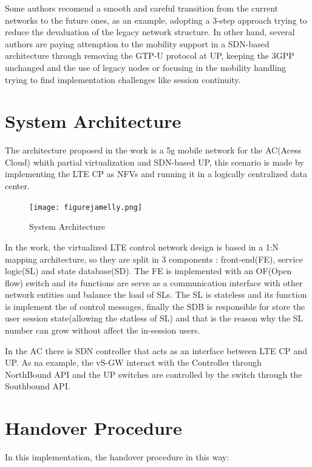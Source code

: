 \documentclass[12pt]{article}
\begin{document}
Some authors recomend a smooth and careful transition from the current networks to the future ones, as an example, adopting a 3-step approach trying to reduce the devaluation of the legacy network structure. In other hand, several authors are paying attemption to the mobility support in a SDN-based architecture through removing the  GTP-U protocol at UP, keeping the 3GPP unchanged and the use of legacy nodes or focusing in the mobility handling trying to find implementation challenges like session continuity. 


\section{System Architecture}

The architecture proposed in the work is a 5g mobile network for the AC(Acess Cloud) whith partial virtualization and SDN-based UP, this scenario is made by implementing the LTE CP as NFVs and running it in a logically centralized data center.

\begin{figure}[ht]
\centering
\texttt{[image: figurejamelly.png]}
\caption{System Architecture}
\label{figure 4: System Architecture}
\end{figure}

In the work, the virtualized LTE control network design is based in a 1:N mapping architecture, so they are split in 3 components : front-end(FE), service logic(SL) and state database(SD). The FE is implemented with an OF(Open flow)	switch and its functions are serve as a communication interface with other network entities and balance the load of SLs. The SL is stateless and its function is implement the of control messages, finally the SDB is responsible for store the user session state(allowing the statless of SL) and that is the reason why the SL number can grow without affect the in-session users.

In the AC there is SDN controller that acts as an interface between LTE CP and UP. As na example, the vS-GW interact with the Controller through NorthBound API and the UP switches are controlled by the switch through the Southbound API.

\section{Handover Procedure}

In this implementation, the handover procedure in this way:
\end{document}
